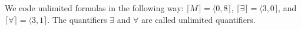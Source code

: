 We code unlimited formulas in the following way: $\lceil M \rceil = \langle 0, 8 \rceil$, $\lceil \exists \rceil = \langle 3, 0 \rceil$, and $\lceil \forall \rceil = \langle 3, 1 \rceil$. The quantifiers $\exists$ and $\forall$ are called unlimited quantifiers.

